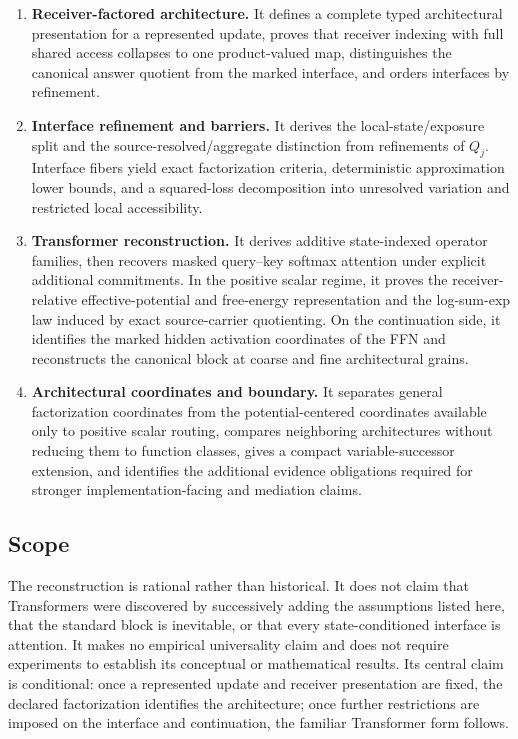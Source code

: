 \begin{enumerate}[label=(\arabic*)]
\item \textbf{Receiver-factored architecture.} It defines a complete typed architectural presentation for a represented update, proves that receiver indexing with full shared access collapses to one product-valued map, distinguishes the canonical answer quotient from the marked interface, and orders interfaces by refinement.

\item \textbf{Interface refinement and barriers.} It derives the local-state/exposure split and the source-resolved/aggregate distinction from refinements of $Q_j$. Interface fibers yield exact factorization criteria, deterministic approximation lower bounds, and a squared-loss decomposition into unresolved variation and restricted local accessibility.

\item \textbf{Transformer reconstruction.} It derives additive state-indexed operator families, then recovers masked query--key softmax attention under explicit additional commitments. In the positive scalar regime, it proves the receiver-relative effective-potential and free-energy representation and the log-sum-exp law induced by exact source-carrier quotienting. On the continuation side, it identifies the marked hidden activation coordinates of the FFN and reconstructs the canonical block at coarse and fine architectural grains.

\item \textbf{Architectural coordinates and boundary.} It separates general factorization coordinates from the potential-centered coordinates available only to positive scalar routing, compares neighboring architectures without reducing them to function classes, gives a compact variable-successor extension, and identifies the additional evidence obligations required for stronger implementation-facing and mediation claims.
\end{enumerate}

\subsection{Scope}

The reconstruction is rational rather than historical. It does not claim that Transformers were discovered by successively adding the assumptions listed here, that the standard block is inevitable, or that every state-conditioned interface is attention. It makes no empirical universality claim and does not require experiments to establish its conceptual or mathematical results. Its central claim is conditional: once a represented update and receiver presentation are fixed, the declared factorization identifies the architecture; once further restrictions are imposed on the interface and continuation, the familiar Transformer form follows.
